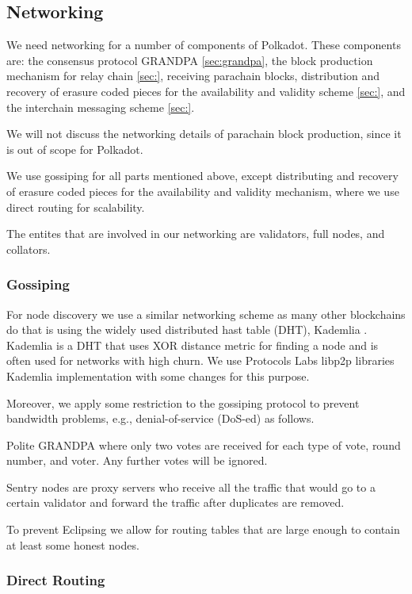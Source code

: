 \subsection{Networking}\label{sec:networking}

We need networking for a number of components of Polkadot.
These components are: the consensus protocol GRANDPA \ref{sec:grandpa},
the block production mechanism for relay chain \ref{sec:},
receiving parachain blocks,
distribution and recovery of erasure coded pieces for the availability and validity scheme \ref{sec:}, and
the interchain messaging scheme \ref{sec:}.

We will not discuss the networking details of parachain block production, since it is out of scope for Polkadot.

We use gossiping for all parts mentioned above, except distributing and recovery of erasure coded pieces for the availability and validity mechanism, where we use direct routing for scalability.

The entites that are involved in our networking are validators, full nodes, and collators.

\subsubsection{Gossiping}
For node discovery we use a similar networking scheme as many other blockchains do that is using the widely used distributed hast table (DHT), Kademlia \cite{}.
Kademlia is a DHT that uses XOR distance metric for finding a node and is often used for networks with high churn.
We use Protocols Labs libp2p libraries \cite{} Kademlia implementation with some changes for this purpose.

Moreover, we apply some restriction to the gossiping protocol to prevent bandwidth problems, e.g., denial-of-service (DoS-ed) as follows.

Polite GRANDPA where only two votes are received for each type of vote, round number, and voter. Any further votes will be ignored.

Sentry nodes are proxy servers who receive all the traffic that would go to a certain validator and forward the traffic after duplicates are removed.

To prevent Eclipsing \cite{} we allow for routing tables that are large enough to contain at least some honest nodes.

\subsubsection{Direct Routing}
